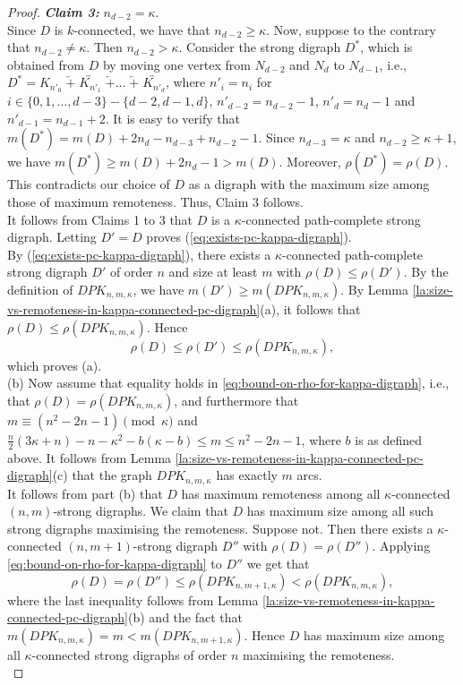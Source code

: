 \documentclass[10pt,a4paper]{amsart}
\begin{document}
\begin{proof}
\emph{{\bf Claim 3:}} $ n_{d-2} = \kappa $. \\

Since $D$ is $k$-connected, we have that $n_{d-2} \geq \kappa$. Now, suppose to the contrary that \( n_{d-2} \neq \kappa \). Then \( n_{d-2} > \kappa \). Consider the strong digraph \( D^* \), which is obtained from \( D \) by moving one vertex from \( N_{d-2} \) and \( N_d \) to \( N_{d-1} \), i.e., $D^*=K_{n'_0} \; \overleftarrow{+} \; \overleftrightarrow{K_{n'_1}} \; \overleftarrow{+} \ldots \; \overleftarrow{+} \; \overleftrightarrow{K_{n'_d}}$, where
$n'_i=n_i$ for $i \in \{0,1,\ldots,d-3\} - \{d-2,d-1,d\}$,  
$n'_{d-2}=n_{d-2}-1$, $n'_{d}=n_{d}-1$ and $n'_{d-1}= n_{d-1}+2$. It is easy to verify that $m(D^*) = m(D) + 2n_d - n_{d-3} + n_{d-2} - 1$. Since \( n_{d-3} = \kappa \) and \( n_{d-2} \geq \kappa+1 \), we have $
m(D^*) \geq m(D) + 2n_d-1 > m(D).
$ Moreover, \( \rho(D^*) = \rho(D) \). This contradicts our choice of $D$ as a digraph with the maximum size among those of maximum remoteness. Thus, Claim 3 follows.  \\



\noindent It follows from Claims 1 to 3 that $D$ is a $\kappa$-connected path-complete strong digraph. Letting $D'=D$ proves (\ref{eq:exists-pc-kappa-digraph}).  \\

By (\ref{eq:exists-pc-kappa-digraph}), there exists a $\kappa$-connected path-complete strong digraph $D'$ of order $n$ and size at least $m$ with $\rho(D) \leq \rho(D')$. By the definition of $DPK_{n,m,\kappa}$, we have $m(D') \geq m(DPK_{n,m,\kappa})$.  By Lemma \ref{la:size-vs-remoteness-in-kappa-connected-pc-digraph}(a), it follows that $\rho(D) \leq \rho(DPK_{n,m,\kappa}) $. Hence 
\[\rho(D) \leq \rho(D') \leq \rho(DPK_{n,m,\kappa}),\]
which proves (a). \\

(b) Now assume that equality holds in \eqref{eq:bound-on-rho-for-kappa-digraph}, i.e., that
$\rho(D) = \rho(DPK_{n,m,\kappa})$, and furthermore that $m \equiv (n^2-2n-1) \pmod{\kappa} $ and $ \frac{n}{2}(3\kappa+n)-n-\kappa^2-b(\kappa-b) \leq m \leq n^2-2n-1$, where $b$ is as defined above. 
It follows from Lemma \ref{la:size-vs-remoteness-in-kappa-connected-pc-digraph}(c) that the 
graph $DPK_{n,m,\kappa}$ has exactly $m$ arcs. \\

It follows from part (b) that $D$ has maximum remoteness among all $\kappa$-connected 
$(n,m)$-strong digraphs. We claim that $D$ has maximum size among all such strong digraphs 
maximising the remoteness. Suppose not. Then there exists a $\kappa$-connected 
$(n,m+1)$-strong digraph $D''$ with $\rho(D) = \rho(D'')$. Applying \eqref{eq:bound-on-rho-for-kappa-digraph} to $D''$ we get that
\[ \rho(D) = \rho(D'') \leq \rho(DPK_{n,m+1,\kappa}) < \rho(DPK_{n,m,\kappa}), \]
where the last inequality follows from 
Lemma \ref{la:size-vs-remoteness-in-kappa-connected-pc-digraph}(b) and the fact that 
$m(DPK_{n,m,\kappa})= m < m(DPK_{n,m+1,\kappa})$. Hence $D$ has maximum size among all $\kappa$-connected strong digraphs of order $n$ maximising the remoteness. \\


\end{proof}
\end{document}
